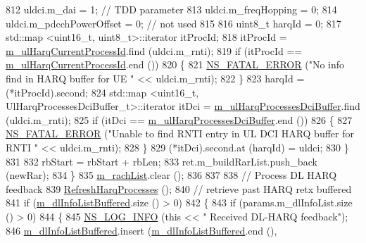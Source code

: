 \begin{DoxyCode}
812           uldci.m\_dai = 1; \textcolor{comment}{// TDD parameter}
813           uldci.m\_freqHopping = 0;
814           uldci.m\_pdcchPowerOffset = 0; \textcolor{comment}{// not used}
815 
816           uint8\_t harqId = 0;
817           std::map <uint16\_t, uint8\_t>::iterator itProcId;
818           itProcId = \hyperlink{classns3_1_1PssFfMacScheduler_a9e2a7c8f3e5e48aa429a5a06f4f70a72}{m\_ulHarqCurrentProcessId}.find (uldci.m\_rnti);
819           \textcolor{keywordflow}{if} (itProcId == \hyperlink{classns3_1_1PssFfMacScheduler_a9e2a7c8f3e5e48aa429a5a06f4f70a72}{m\_ulHarqCurrentProcessId}.end ())
820             \{
821               \hyperlink{group__fatal_ga5131d5e3f75d7d4cbfd706ac456fdc85}{NS\_FATAL\_ERROR} (\textcolor{stringliteral}{"No info find in HARQ buffer for UE "} << uldci.m\_rnti);
822             \}
823           harqId = (*itProcId).second;
824           std::map <uint16\_t, UlHarqProcessesDciBuffer\_t>::iterator itDci = 
      \hyperlink{classns3_1_1PssFfMacScheduler_adfb2ba26a401807d40208e7b8f01f813}{m\_ulHarqProcessesDciBuffer}.find (uldci.m\_rnti);
825           \textcolor{keywordflow}{if} (itDci == \hyperlink{classns3_1_1PssFfMacScheduler_adfb2ba26a401807d40208e7b8f01f813}{m\_ulHarqProcessesDciBuffer}.end ())
826             \{
827               \hyperlink{group__fatal_ga5131d5e3f75d7d4cbfd706ac456fdc85}{NS\_FATAL\_ERROR} (\textcolor{stringliteral}{"Unable to find RNTI entry in UL DCI HARQ buffer for RNTI "} << 
      uldci.m\_rnti);
828             \}
829           (*itDci).second.at (harqId) = uldci;
830         \}
831 
832       rbStart = rbStart + rbLen;
833       ret.m\_buildRarList.push\_back (newRar);
834     \}
835   \hyperlink{classns3_1_1PssFfMacScheduler_a7365478ecd213eef5da163ace10a94ed}{m\_rachList}.clear ();
836 
837 
838   \textcolor{comment}{// Process DL HARQ feedback}
839   \hyperlink{classns3_1_1PssFfMacScheduler_ab4cc64c15c7cf1365bad5ae358e99437}{RefreshHarqProcesses} ();
840   \textcolor{comment}{// retrieve past HARQ retx buffered}
841   \textcolor{keywordflow}{if} (\hyperlink{classns3_1_1PssFfMacScheduler_a3a7d9c7460c66767201d15a1d6f58758}{m\_dlInfoListBuffered}.size () > 0)
842     \{
843       \textcolor{keywordflow}{if} (params.m\_dlInfoList.size () > 0)
844         \{
845           \hyperlink{group__logging_gafbd73ee2cf9f26b319f49086d8e860fb}{NS\_LOG\_INFO} (\textcolor{keyword}{this} << \textcolor{stringliteral}{" Received DL-HARQ feedback"});
846           \hyperlink{classns3_1_1PssFfMacScheduler_a3a7d9c7460c66767201d15a1d6f58758}{m\_dlInfoListBuffered}.insert (\hyperlink{classns3_1_1PssFfMacScheduler_a3a7d9c7460c66767201d15a1d6f58758}{m\_dlInfoListBuffered}.end (),

\end{DoxyCode}
